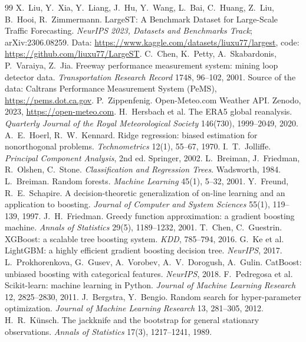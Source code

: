 \documentclass[11pt,a4paper]{article}
\begin{document}
\begin{thebibliography}{99}\small
{} X.~Liu, Y.~Xia, Y.~Liang, J.~Hu, Y.~Wang, L.~Bai, C.~Huang, Z.~Liu, B.~Hooi, R.~Zimmermann. LargeST: A Benchmark Dataset for Large-Scale Traffic Forecasting. \emph{NeurIPS 2023, Datasets and Benchmarks Track}; arXiv:2306.08259. Data: \url{https://www.kaggle.com/datasets/liuxu77/largest}, code: \url{https://github.com/liuxu77/LargeST}.
 C.~Chen, K.~Petty, A.~Skabardonis, P.~Varaiya, Z.~Jia. Freeway performance measurement system: mining loop detector data. \emph{Transportation Research Record} 1748, 96--102, 2001. Source of the data: Caltrans Performance Measurement System (PeMS), \url{https://pems.dot.ca.gov}.
 P.~Zippenfenig. Open-Meteo.com Weather API. Zenodo, 2023, \url{https://open-meteo.com}.
 H.~Hersbach et al. The ERA5 global reanalysis. \emph{Quarterly Journal of the Royal Meteorological Society} 146(730), 1999--2049, 2020.
 A.~E.~Hoerl, R.~W.~Kennard. Ridge regression: biased estimation for nonorthogonal problems. \emph{Technometrics} 12(1), 55--67, 1970.
 I.~T.~Jolliffe. \emph{Principal Component Analysis}, 2nd ed. Springer, 2002.
 L.~Breiman, J.~Friedman, R.~Olshen, C.~Stone. \emph{Classification and Regression Trees}. Wadsworth, 1984.
 L.~Breiman. Random forests. \emph{Machine Learning} 45(1), 5--32, 2001.
 Y.~Freund, R.~E.~Schapire. A decision-theoretic generalization of on-line learning and an application to boosting. \emph{Journal of Computer and System Sciences} 55(1), 119--139, 1997.
 J.~H.~Friedman. Greedy function approximation: a gradient boosting machine. \emph{Annals of Statistics} 29(5), 1189--1232, 2001.
 T.~Chen, C.~Guestrin. XGBoost: a scalable tree boosting system. \emph{KDD}, 785--794, 2016.
 G.~Ke et al. LightGBM: a highly efficient gradient boosting decision tree. \emph{NeurIPS}, 2017.
 L.~Prokhorenkova, G.~Gusev, A.~Vorobev, A.~V.~Dorogush, A.~Gulin. CatBoost: unbiased boosting with categorical features. \emph{NeurIPS}, 2018.
 F.~Pedregosa et al. Scikit-learn: machine learning in Python. \emph{Journal of Machine Learning Research} 12, 2825--2830, 2011.
 J.~Bergstra, Y.~Bengio. Random search for hyper-parameter optimization. \emph{Journal of Machine Learning Research} 13, 281--305, 2012.
 H.~R.~K\"unsch. The jackknife and the bootstrap for general stationary observations. \emph{Annals of Statistics} 17(3), 1217--1241, 1989.

\end{thebibliography}
\end{document}
